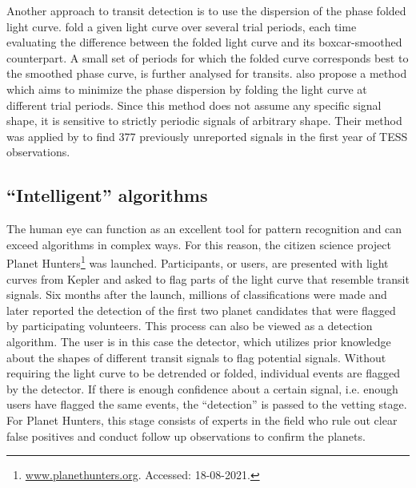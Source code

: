 Another approach to transit detection is to use the dispersion of the phase folded light curve. \cite{plavchan2008near} fold a given light curve over several trial periods, each time evaluating the difference between the folded light curve and its boxcar-smoothed counterpart. A small set of periods for which the folded curve corresponds best to the smoothed phase curve, is further analysed for transits. \cite{wheeler2019weird} also propose a method which aims to minimize the phase dispersion by folding the light curve at different trial periods. Since this method does not assume any specific signal shape, it is sensitive to strictly periodic signals of arbitrary shape. Their method was applied by \cite{chakraborty2020hundreds} to find 377 previously unreported signals in the first year of TESS observations.

\subsection{``Intelligent'' algorithms}

The human eye can function as an excellent tool for pattern recognition and can exceed algorithms in complex ways. For this reason, the citizen science project Planet Hunters\footnote{\url{www.planethunters.org}. Accessed: 18-08-2021.} was launched. Participants, or users, are presented with light curves from Kepler and asked to flag parts of the light curve that resemble transit signals. Six months after the launch, millions of classifications were made and later \cite{fischer2012planet} reported the detection of the first two planet candidates that were flagged by participating volunteers. This process can also be viewed as a detection algorithm. The user is in this case the detector, which utilizes prior knowledge about the shapes of different transit signals to flag potential signals. Without requiring the light curve to be detrended or folded, individual events are flagged by the detector. If there is enough confidence about a certain signal, i.e. enough users have flagged the same events, the ``detection'' is passed to the vetting stage. For Planet Hunters, this stage consists of experts in the field who rule out clear false positives and conduct follow up observations to confirm the planets. 

